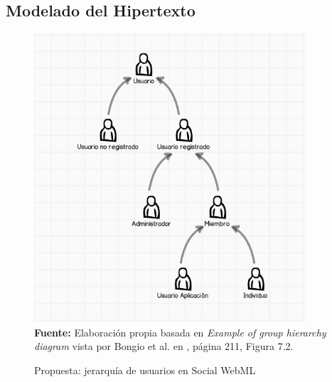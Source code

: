 \documentclass[oneside,12pt,a4paper]{memoir}%
\begin{document}
		\subsection{Modelado del Hipertexto}
		\label{sec:proposalHypertext}
		
		\begin{figure}[here]
			\centering
			\caption{Propuesta: jerarqu\'ia de usuarios en Social WebML}
			\includegraphics[width=0.9\textwidth]{figure/fig_proposalUserHierarchical.png}
			\newline
			\textbf{Fuente:} Elaboraci\'on propia basada en \textit{Example of group
			hierarchy diagram} vista por Bongio et al. en \cite{Ceri2003}, p\'agina
			211, Figura 7.2.
			\label{fig:proposalUser}
		\end{figure}
		
\end{document}
